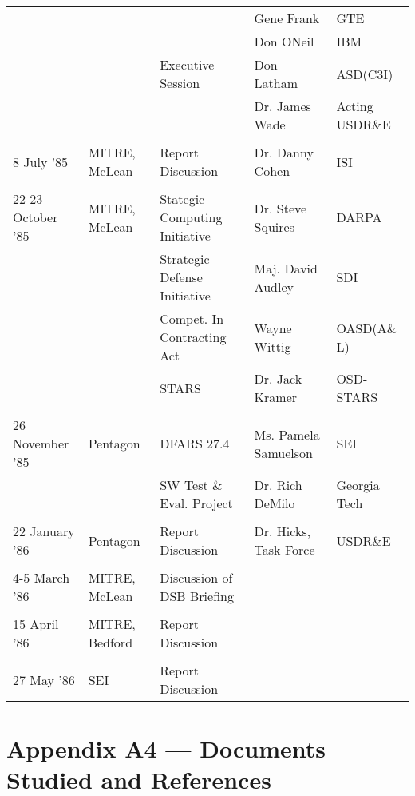 \documentclass[12pt]{article}
\begin{document}
\begin{footnotesize}
\begin{tabular}{ l l l l l }
 & & & Gene Frank                    & GTE\\
 & & & Don ONeil                     & IBM\\
 & & Executive Session & Don Latham  & ASD(C3I)\\
 & & & Dr. James Wade                & Acting USDR\&E\\
\\
8 July '85 & MITRE, McLean & Report Discussion & Dr. Danny Cohen & ISI\\
\\
22-23 October '85 & MITRE, McLean & Stategic Computing Initiative & Dr. Steve Squires & DARPA\\
 & & Strategic Defense Initiative  & Maj. David Audley & SDI\\
 & & Compet. In Contracting Act    & Wayne Wittig      & OASD(A\& L)   \\
 & & STARS                         & Dr. Jack Kramer   & OSD-STARS      \\
\\
26 November '85 & Pentagon    & DFARS 27.4                & Ms. Pamela Samuelson & SEI           \\
                         & &  SW Test \& Eval. Project  & Dr. Rich DeMilo      & Georgia Tech      \\
\\
22 January '86 & Pentagon & Report Discussion & Dr. Hicks, Task Force & USDR\&E\\
\\
    4-5 March '86 & MITRE, McLean & Discussion of DSB Briefing\\
\\
    15 April '86 & MITRE, Bedford & Report Discussion\\
\\
    27 May '86 & SEI & Report Discussion\\
\end{tabular}
\end{footnotesize}


\newpage

\section*{Appendix A4 — Documents Studied and References}
\end{document}
